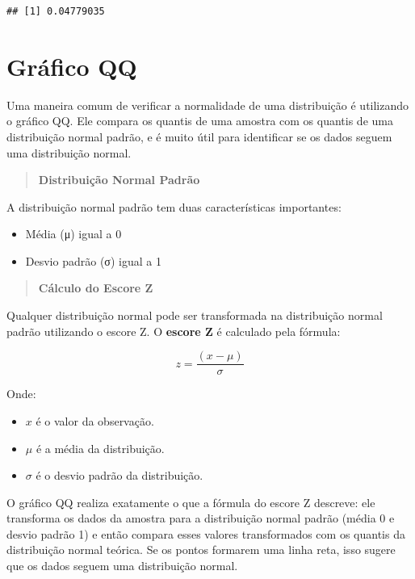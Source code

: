 \documentclass[
]{book}
\providecommand{\tightlist}{%
  \setlength{\itemsep}{0pt}\setlength{\parskip}{0pt}}
\begin{document}
\begin{verbatim}
## [1] 0.04779035
\end{verbatim}

\section{Gráfico QQ}\label{gruxe1fico-qq}

Uma maneira comum de verificar a normalidade de uma distribuição é utilizando o gráfico QQ. Ele compara os quantis de uma amostra com os quantis de uma distribuição normal padrão, e é muito útil para identificar se os dados seguem uma distribuição normal.

\begin{quote}
\textbf{Distribuição Normal Padrão}
\end{quote}

A distribuição normal padrão tem duas características importantes:

\begin{itemize}
\tightlist
\item
  Média (μ) igual a 0
\item
  Desvio padrão (σ) igual a 1
\end{itemize}

\begin{quote}
\textbf{Cálculo do Escore Z}
\end{quote}

Qualquer distribuição normal pode ser transformada na distribuição normal padrão utilizando o escore Z. O \textbf{escore Z} é calculado pela fórmula:

\[
z = \frac{(x - \mu)}{\sigma}
\]

Onde:

\begin{itemize}
\tightlist
\item
  \(x\) é o valor da observação.
\item
  \(\mu\) é a média da distribuição.
\item
  \(\sigma\) é o desvio padrão da distribuição.
\end{itemize}

O gráfico QQ realiza exatamente o que a fórmula do escore Z descreve: ele transforma os dados da amostra para a distribuição normal padrão (média 0 e desvio padrão 1) e então compara esses valores transformados com os quantis da distribuição normal teórica. Se os pontos formarem uma linha reta, isso sugere que os dados seguem uma distribuição normal.
\end{document}
